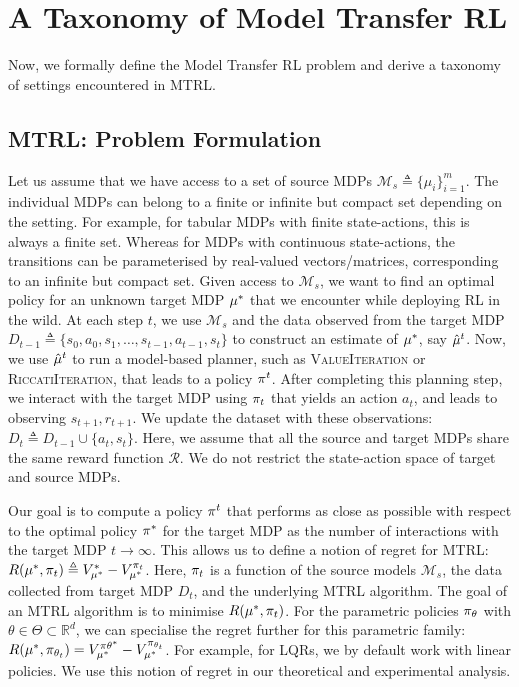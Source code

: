 \section{A Taxonomy of Model Transfer RL}\label{sec:trl}
Now, we formally define the Model Transfer RL problem and derive a taxonomy of settings encountered in MTRL.

\subsection{MTRL: Problem Formulation}
Let us assume that we have access to a set of source MDPs $\mathcal{M}_s \triangleq \{\mu_i\}_{i=1}^m$. The individual MDPs can belong to a finite or infinite but compact set depending on the setting. For example, for tabular MDPs with finite state-actions, this is always a finite set. Whereas for MDPs with continuous state-actions, the transitions can be parameterised by real-valued vectors/matrices, corresponding to an infinite but compact set.
Given access to $\mathcal{M}_s$, we want to find an optimal policy for an unknown target MDP $\mu^*$ that we encounter while deploying RL in the wild.
At each step $t$, we use $\mathcal{M}_s$ and the data observed from the target MDP $D_{t-1} \triangleq \{ s_0, a_0, s_1, \ldots, s_{t-1}, a_{t-1}, s_t\}$ to construct an estimate of $\mu^*$, say $\hat{\mu}^t$. Now, we use $\hat{\mu}^t$ to run a model-based planner, such as \textsc{ValueIteration} or \textsc{RiccatiIteration}, that leads to a policy $\pi^t$. After completing this planning step, we interact with the target MDP using $\pi_t$ that yields an action $a_t$, and leads to observing $s_{t+1}, r_{t+1}$. We update the dataset with these observations: $D_t \triangleq D_{t-1} \cup \{a_{t}, s_t\}$. Here, we assume that all the source and target MDPs share the same reward function $\mathcal{R}$. We do not restrict the state-action space of target and source MDPs. %

Our goal is to compute a policy ${\pi}^t$ that performs as close as possible with respect to the optimal policy $\pi^*$ for the target MDP as the number of interactions with the target MDP $t\rightarrow \infty$.
This allows us to define a notion of regret for MTRL: $R(\mu^{*}, \pi_t) \triangleq V_{\mu^{*}}^{*}-V_{\mu^{*}}^{\pi_t}$. Here, $\pi_t$ is a function of the source models $\mathcal{M}_s$, the data collected from target MDP $D_t$, and the underlying MTRL algorithm.
The goal of an MTRL algorithm is to minimise $R(\mu^{*}, \pi_t)$.
For the parametric policies $\pi_{\theta}$ with $\theta \in \Theta \subset \mathbb{R}^d$, we can specialise the regret further for this parametric family: $R(\mu^{*}, \pi_{\theta_t}) = V_{\mu^{*}}^{\pi{\theta^*}}-V_{\mu^{*}}^{\pi_{\theta_t}}$. For example, for LQRs, we by default work with linear policies. We use this notion of regret in our theoretical and experimental analysis.

